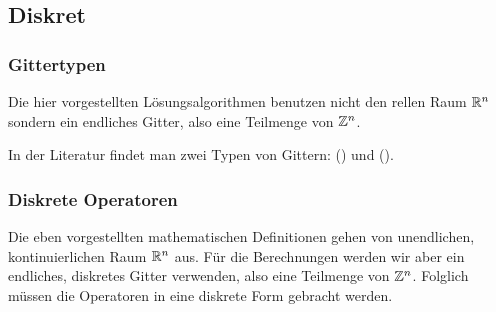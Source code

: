 \subsection{Diskret}

\subsubsection{Gittertypen}

Die hier vorgestellten Lösungsalgorithmen benutzen nicht den rellen Raum
$\mathbb{R}^n$ sondern ein endliches Gitter, also eine Teilmenge von
$\mathbb{Z}^n$.

In der Literatur findet man zwei Typen von Gittern: 
() und 
().

\subsubsection{Diskrete Operatoren}

Die eben vorgestellten mathematischen Definitionen gehen von unendlichen,
kontinuierlichen Raum $\mathbb{R}^n$ aus. Für die Berechnungen werden wir
aber ein endliches, diskretes Gitter verwenden, also eine Teilmenge von
$\mathbb{Z}^n$. Folglich müssen die Operatoren in eine diskrete Form gebracht
werden.

